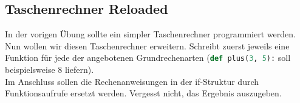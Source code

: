 \subsection{Taschenrechner Reloaded }
In der vorigen Übung sollte ein simpler Taschenrechner programmiert werden. Nun wollen wir diesen Taschenrechner erweitern. Schreibt zuerst jeweils eine Funktion für jede der angebotenen Grundrechenarten (\lstinline[language=python]{def plus(3, 5):} soll beispielsweise 8 liefern).\\
Im Anschluss sollen die Rechenanweisungen in der if-Struktur durch Funktionsaufrufe ersetzt werden. Vergesst nicht, das Ergebnis auszugeben.

